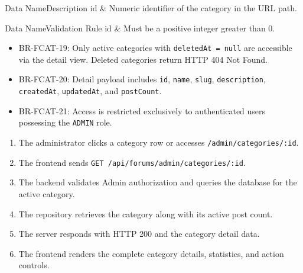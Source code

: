 \begin{specdatatable}{Data Name}{Description}
id & Numeric identifier of the category in the URL path.\\ \hline
\end{specdatatable}

\begin{specdatatable}{Data Name}{Validation Rule}
id & Must be a positive integer greater than 0.\\ \hline
\end{specdatatable}

\begin{itemize}[leftmargin=1.6em,topsep=3pt,itemsep=2pt,parsep=0pt,label=$\bullet$]\brrulelist
    \item BR-FCAT-19: Only active categories with \texttt{deletedAt = null} are accessible via the detail view. Deleted categories return HTTP 404 Not Found.
    \item BR-FCAT-20: Detail payload includes \texttt{id}, \texttt{name}, \texttt{slug}, \texttt{description}, \texttt{createdAt}, \texttt{updatedAt}, and \texttt{postCount}.
    \item BR-FCAT-21: Access is restricted exclusively to authenticated users possessing the \texttt{ADMIN} role.
\end{itemize}

\begin{enumerate}[leftmargin=1.6em,topsep=3pt,itemsep=2pt,parsep=0pt]
    \item The administrator clicks a category row or accesses \texttt{/admin/categories/:id}.
    \item The frontend sends \texttt{GET /api/forums/admin/categories/:id}.
    \item The backend validates Admin authorization and queries the database for the active category.
    \item The repository retrieves the category along with its active post count.
    \item The server responds with HTTP 200 and the category detail data.
    \item The frontend renders the complete category details, statistics, and action controls.
\end{enumerate}

